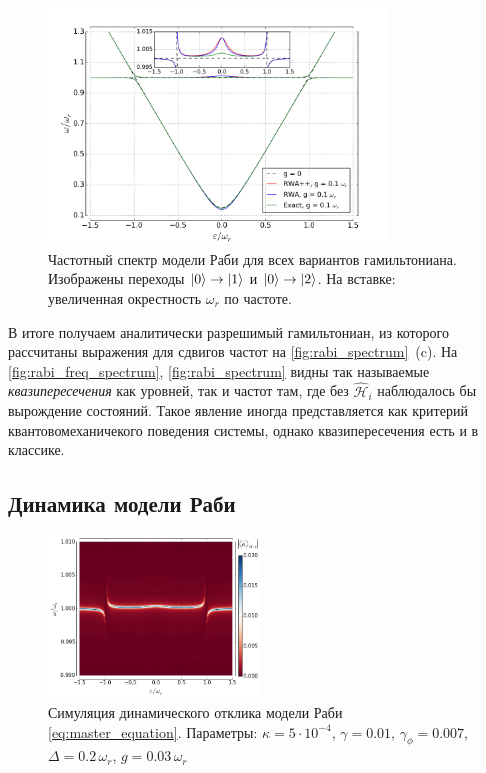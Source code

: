 \documentclass[12pt, twoside]{report}
\DeclarePairedDelimiter\ket{\lvert}{\rangle}
\numberwithin{equation}{section}
\numberwithin{figure}{section}
\begin{document}
\begin{figure}[h!]
\centering
\includegraphics[width=0.8\textwidth]{Pictures/rabi_spectrum_freq}
\caption{Частотный спектр модели Раби для всех вариантов гамильтониана. Изображены переходы $\ket{0}\rightarrow\ket{1}$ и $\ket{0}\rightarrow\ket{2}$. На вставке: увеличенная окрестность $\omega_r$ по частоте.}
\label{fig:rabi_freq_spectrum}
\end{figure}


В итоге получаем аналитически разрешимый гамильтониан\cite{Jerger2013}, из которого рассчитаны выражения для сдвигов частот на \autoref{fig:rabi_spectrum}~(c). На \autoref{fig:rabi_freq_spectrum}, \autoref{fig:rabi_spectrum} видны так называемые \textit{квазипересечения} как уровней, так и частот там, где без $\mathcal{\hat H}_i$ наблюдалось бы вырождение состояний. Такое явление иногда представляется как критерий квантовомеханичекого поведения системы, однако квазипересечения есть и в классике\cite{novotny2010}. 


\newpage
\subsection{Динамика модели Раби} \label{subsec:rabi_specrum_dyn}

\begin{figure}
\includegraphics[width=0.5\textwidth]{Pictures/Rabi_anticrossing_far_dyn}
\caption{Симуляция динамического отклика модели Раби \eqref{eq:master_equation}. Параметры: $\kappa = 5\cdot 10^{-4}$, $\gamma = 0.01$, $\gamma_\phi = 0.007$, $\Delta = 0.2\,\omega_r$, $g=0.03\,\omega_r$}
\label{fig:rabi_spec_dyn}
\end{figure}
\end{document}
